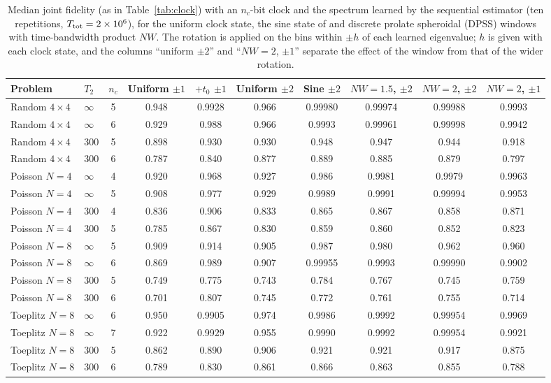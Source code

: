 \documentclass[journal]{IEEEtran}
\begin{document}
\begin{table}[t]
\caption{Median joint fidelity (as in Table~\ref{tab:clock}) with an $n_c$-bit clock and the spectrum learned by the sequential estimator (ten repetitions, $T_{\rm tot}=2\times10^6$), for the uniform clock state, the sine state of \cite{HHL2009} and discrete prolate spheroidal (DPSS) windows with time-bandwidth product $NW$. The rotation is applied on the bins within $\pm h$ of each learned eigenvalue; $h$ is given with each clock state, and the columns ``uniform $\pm2$'' and ``$NW=2$, $\pm1$'' separate the effect of the window from that of the wider rotation.}
\label{tab:window}
\centering\footnotesize
\begin{tabular}{llcccccccc}
\toprule
Problem & $T_2$ & $n_c$ & Uniform $\pm1$ & $+t_0$ $\pm1$ & Uniform $\pm2$ & Sine $\pm2$ & $NW=1.5$, $\pm2$ & $NW=2$, $\pm2$ & $NW=2$, $\pm1$\\
\midrule
Random $4\times4$ & $\infty$ & 5 & 0.948 & 0.9928 & 0.966 & 0.99980 & 0.99974 & 0.99988 & 0.9993\\
Random $4\times4$ & $\infty$ & 6 & 0.929 & 0.988 & 0.966 & 0.9993 & 0.99961 & 0.99998 & 0.9942\\
Random $4\times4$ & 300 & 5 & 0.898 & 0.930 & 0.930 & 0.948 & 0.947 & 0.944 & 0.918\\
Random $4\times4$ & 300 & 6 & 0.787 & 0.840 & 0.877 & 0.889 & 0.885 & 0.879 & 0.797\\
Poisson $N=4$ & $\infty$ & 4 & 0.920 & 0.968 & 0.927 & 0.986 & 0.9981 & 0.9979 & 0.9963\\
Poisson $N=4$ & $\infty$ & 5 & 0.908 & 0.977 & 0.929 & 0.9989 & 0.9991 & 0.99994 & 0.9953\\
Poisson $N=4$ & 300 & 4 & 0.836 & 0.906 & 0.833 & 0.865 & 0.867 & 0.858 & 0.871\\
Poisson $N=4$ & 300 & 5 & 0.785 & 0.867 & 0.830 & 0.859 & 0.860 & 0.852 & 0.823\\
Poisson $N=8$ & $\infty$ & 5 & 0.909 & 0.914 & 0.905 & 0.987 & 0.980 & 0.962 & 0.960\\
Poisson $N=8$ & $\infty$ & 6 & 0.869 & 0.989 & 0.907 & 0.99955 & 0.9993 & 0.99990 & 0.9902\\
Poisson $N=8$ & 300 & 5 & 0.749 & 0.775 & 0.743 & 0.784 & 0.767 & 0.745 & 0.759\\
Poisson $N=8$ & 300 & 6 & 0.701 & 0.807 & 0.745 & 0.772 & 0.761 & 0.755 & 0.714\\
Toeplitz $N=8$ & $\infty$ & 6 & 0.950 & 0.9905 & 0.974 & 0.9986 & 0.9992 & 0.99954 & 0.9969\\
Toeplitz $N=8$ & $\infty$ & 7 & 0.922 & 0.9929 & 0.955 & 0.9990 & 0.9992 & 0.99954 & 0.9921\\
Toeplitz $N=8$ & 300 & 5 & 0.862 & 0.890 & 0.906 & 0.921 & 0.921 & 0.917 & 0.875\\
Toeplitz $N=8$ & 300 & 6 & 0.789 & 0.830 & 0.861 & 0.866 & 0.863 & 0.855 & 0.788\\
\bottomrule
\end{tabular}
\end{table}
\end{document}
